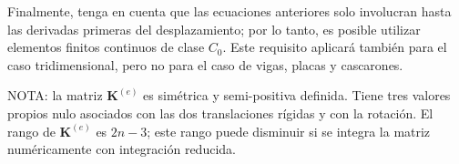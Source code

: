 \documentclass[12pt,letterpaper, landscape]{article}
\newcommand{\e}{{}}
\newcommand{\ma}[1]{{\boldsymbol{#1}}}
\newcommand{\dd}{\operatorname{d} \!}
\begin{document}
Finalmente, tenga en cuenta que las ecuaciones anteriores solo involucran hasta las derivadas primeras del desplazamiento; por lo tanto, es posible utilizar elementos finitos continuos de clase $C_0$. Este requisito aplicará también para el caso tridimensional, pero no para el caso de vigas, placas y cascarones.

NOTA: la matriz $\ma{K}^{(e)}$ es simétrica y semi-positiva definida. Tiene tres valores propios nulo asociados con las dos translaciones rígidas y con la rotación. El rango de $\ma{K}^{(e)}$ es $2n-3$; este rango puede disminuir si se integra la matriz numéricamente con integración reducida.


%
%
\end{document}
